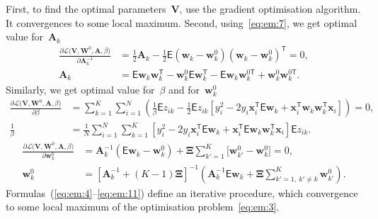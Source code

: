 \documentclass[12pt, twoside]{article}
\numberwithin{equation}{section}
\begin{document}
First, to find the optimal parameters~$\textbf{V}$, use the gradient optimisation algorithm. It convergences to some local maximum.
Second, using~\eqref{eq:em:7}, we get optimal value for~$\textbf{A}_{k}$
\[
\label{eq:em:9}
\begin{aligned}
\frac{\partial \mathcal{L}\bigr(\textbf{V}, \textbf{W}^{0}, \textbf{A}, \beta\bigr)}{\partial \textbf{A}^{-1}_k} &=  \frac{1}{2}\textbf{A}_{k} - \frac{1}{2}\mathsf{E}\left(\textbf{w}_{k} - \textbf{w}_{k}^{0}\right)\left(\textbf{w}_{k} - \textbf{w}_{k}^{0}\right)^{\mathsf{T}} = 0,\\
\textbf{A}_{k} &= \mathsf{E}\textbf{w}_{k}\textbf{w}_{k}^{\mathsf{T}} - \textbf{w}_{k}^{0}\mathsf{E}\textbf{w}_{k}^{\mathsf{T}} - \mathsf{E}\textbf{w}_{k}\textbf{w}_{k}^{0\mathsf{T}} + \textbf{w}_{k}^{0}\textbf{w}_{k}^{0\mathsf{T}}.
\end{aligned}
\]
Similarly, we get optimal value for~$\beta$ and for~$\textbf{w}_{k}^{0}$
\[
\label{eq:em:10}
\begin{aligned}
\frac{\partial \mathcal{L}\bigr(\textbf{V}, \textbf{W}^{0}, \textbf{A}, \beta\bigr)}{\partial \beta} &= \sum_{k=1}^{K}\sum_{i=1}^{N}\left(\frac{1}{\beta}\mathsf{E}z_{ik}-\frac{1}{2}\mathsf{E}z_{ik}\left[y_{i}^{2}-2y_{i}\textbf{x}_{i}^{\mathsf{T}}\mathsf{E}\textbf{w}_{k}+\textbf{x}_{i}^{\mathsf{T}}\textbf{w}_{k}\textbf{w}_{k}^{\mathsf{T}}\textbf{x}_{i}\right]\right) = 0,\\
\frac{1}{\beta}&=\frac{1}{N}\sum_{i=1}^{N}\sum_{k=1}^{K}\left[y_{i}^{2}-2y_{i}\textbf{x}_{i}^{\mathsf{T}}\mathsf{E}\textbf{w}_{k} + \textbf{x}_{i}^{\mathsf{T}}\mathsf{E}\textbf{w}_{k}\textbf{w}_{k}^{\mathsf{T}}\textbf{x}_{i}\right]\mathsf{E}z_{ik}.
\end{aligned}
\]
\[
\label{eq:em:11}
\begin{aligned}
\frac{\partial \mathcal{L}\bigr(\textbf{V}, \textbf{W}^{0}, \textbf{A}, \beta\bigr)}{\partial \mathbf{w}_k^0} &= \mathbf{A}_k^{-1}\left(\mathsf{E}\mathbf{w}_k - \mathbf{w}_{k}^{0}\right) + \bm{\Xi}\sum_{k'=1}^{K}\bigr[\mathbf{w}_{k'}^{0} -\mathbf{w}_{k}^{0}\bigr] = 0,\\
\textbf{w}_{k}^{0} &=\left[\textbf{A}_{k}^{-1}+\left(K-1\right)\bm{\Xi}\right]^{-1}\left(\textbf{A}^{-1}_{k}\mathsf{E}\textbf{w}_{k}+\bm{\Xi}\sum_{k'=1,~k'\not=k}^{K}\textbf{w}_{k'}^{0}\right).
\end{aligned}
\]
Formulas~(\ref{eq:em:4}--\ref{eq:em:11}) define an iterative procedure, which convergence to some local maximum of the optimisation problem~\eqref{eq:em:3}.
\end{document}
